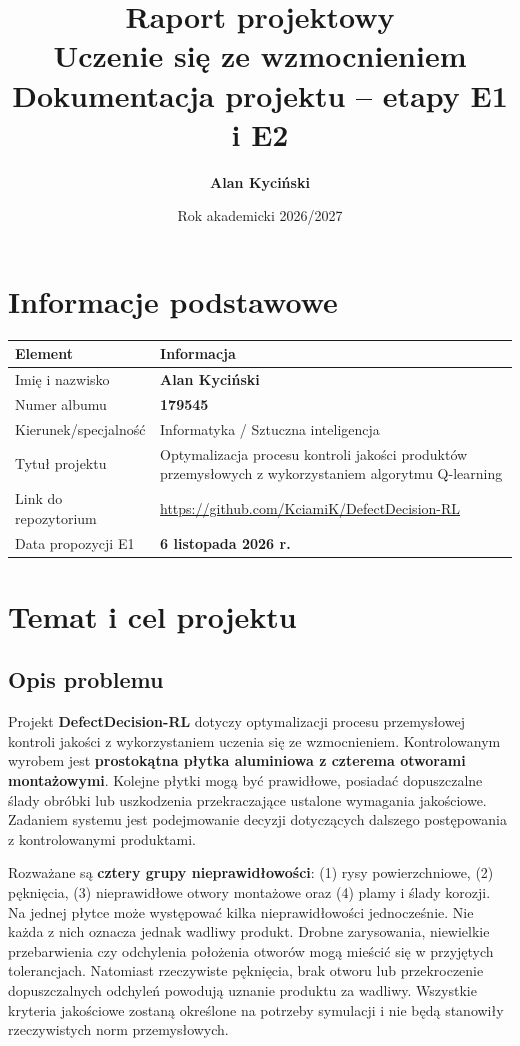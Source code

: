 \documentclass[12pt]{article}
\title{Raport projektowy\\Uczenie się ze wzmocnieniem\\[0.35em]\large Dokumentacja projektu -- etapy E1 i E2}
\author{\textbf{Alan Kyciński}}
\date{Rok akademicki 2026/2027}
\begin{document}
\maketitle
\tableofcontents
\newpage


\section{Informacje podstawowe}

\begin{center}
\renewcommand{\arraystretch}{1.22}
\begin{tabular}{p{}p{}}
\toprule
Element & Informacja \\
\midrule
Imię i nazwisko & \textbf{Alan Kyciński} \\
Numer albumu & \textbf{179545} \\
Kierunek/specjalność & Informatyka / Sztuczna inteligencja \\
Tytuł projektu & Optymalizacja procesu kontroli jakości produktów przemysłowych z wykorzystaniem algorytmu Q-learning \\
Link do repozytorium & {\small\url{https://github.com/KciamiK/DefectDecision-RL}} \\
Data propozycji E1 & \textbf{6 listopada 2026 r.} \\
\bottomrule
\end{tabular}
\end{center}

\section{Temat i cel projektu}

\subsection{Opis problemu}

Projekt \textbf{DefectDecision-RL} dotyczy optymalizacji procesu przemysłowej kontroli jakości z wykorzystaniem uczenia się ze wzmocnieniem. Kontrolowanym wyrobem jest \textbf{prostokątna płytka aluminiowa z czterema otworami montażowymi}. Kolejne płytki mogą być prawidłowe, posiadać dopuszczalne ślady obróbki lub uszkodzenia przekraczające ustalone wymagania jakościowe. Zadaniem systemu jest podejmowanie decyzji dotyczących dalszego postępowania z kontrolowanymi produktami.

Rozważane są \textbf{cztery grupy nieprawidłowości}: (1) rysy powierzchniowe, (2) pęknięcia, (3) nieprawidłowe otwory montażowe oraz (4) plamy i ślady korozji. Na jednej płytce może występować kilka nieprawidłowości jednocześnie. Nie każda z nich oznacza jednak wadliwy produkt. Drobne zarysowania, niewielkie przebarwienia czy odchylenia położenia otworów mogą mieścić się w przyjętych tolerancjach. Natomiast rzeczywiste pęknięcia, brak otworu lub przekroczenie dopuszczalnych odchyleń powodują uznanie produktu za wadliwy. Wszystkie kryteria jakościowe zostaną określone na potrzeby symulacji i nie będą stanowiły rzeczywistych norm przemysłowych.
\end{document}
